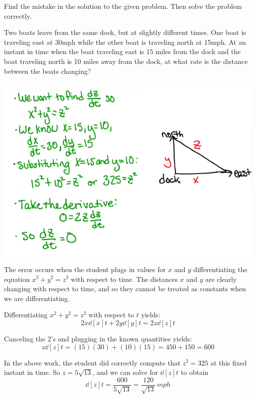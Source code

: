\documentclass[nooutcomes,handout]{ximera}
\begin{document}
\begin{problem}
Find the mistake in the solution to the given problem.  Then solve the problem correctly.

Two boats leave from the same dock, but at slightly different times.  One boat is traveling east at 30mph while the other boat is traveling north at 15mph.  At an instant in time when the boat traveling east is 15 miles from the dock and the boat traveling north is 10 miles away from the dock, at what rate is the distance between the boats changing?
	\begin{image}
	\includegraphics[scale=.7]{Figure1.png}
	\end{image}
	
		\begin{freeResponse} 
		The error occurs when the student plugs in values for $x$ and $y$  differentiating the equation $x^2 + y^2 = z^2$ with respect to time.  The distances $x$ and $y$ are clearly changing with respect to time, and so they cannot be treated as constants when we are differentiating.
		
		Differentiating $x^2 + y^2 = z^2$ with respect to $t$ yields:
		$$ 2x \dd[x]{t} + 2y \dd[y]{t} = 2z \dd[z]{t}$$
		
		Canceling the 2's and plugging in the known quantities yields:
		$$ z \dd[z]{t} = (15)(30) + (10)(15) = 450 + 150 = 600 $$
		
		In the above work, the student did correctly compute that $z^2 = 325$ at this fixed instant in time.  So $z = 5\sqrt{13}$, and we can solve for $\dd[z]{t}$ to obtain
		$$ \dd[z]{t} = \frac{600}{5 \sqrt{13}} = \frac{120}{\sqrt{13}} \, mph $$
		\end{freeResponse}	

\end{problem}
\end{document}
